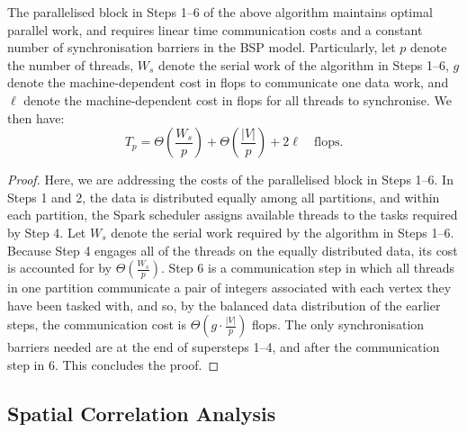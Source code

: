 \begin{proposition}
The parallelised block in Steps 1--6 of the above algorithm maintains optimal parallel work, and requires linear time communication costs and a constant number of synchronisation barriers in the BSP model. Particularly, let $p$ denote the number of threads, $W_s$ denote the serial work of the algorithm in Steps 1--6, $g$ denote the machine-dependent cost in flops to communicate one data work, and $\ell$ denote the machine-dependent cost in flops for all threads to synchronise. We then have:
\[
T_p = \Theta\left(\frac{W_s}{p}\right) + \Theta \left(\frac{\left \vert V \right \vert}{p}\right) + 2 \ell \quad \mbox{flops.} 
\]
\end{proposition}
\begin{proof}
Here, we are addressing the costs of the parallelised block in Steps 1--6. In Steps 1 and 2, the data is distributed equally among all partitions, and within each partition, the Spark scheduler assigns available threads to the tasks required by Step 4. Let $W_s$ denote the serial work required by the algorithm in Steps 1--6. Because Step 4 engages all of the threads on the equally distributed data, its cost is accounted for by $\Theta\left(\frac{W_s}{p}\right)$. 
%
%
Step 6 is a communication step in which all threads in one partition communicate a pair of integers associated with each vertex they have been tasked with, and so, by the balanced data distribution of the earlier steps, the communication cost is $\Theta \left (g \cdot \frac{\left \vert V \right \vert}{p} \right)$ flops. The only synchronisation barriers needed are at the end of supersteps 1--4, and after the communication step in 6. This concludes the proof.
\end{proof}

\subsection{Spatial Correlation Analysis}


